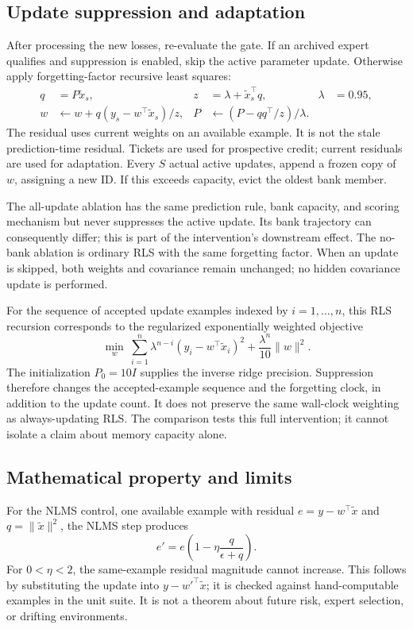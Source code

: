 \documentclass[10pt]{article}
\begin{document}
\subsection{Update suppression and adaptation}
After processing the new losses, re-evaluate the gate. If an archived expert qualifies and suppression is enabled, skip the active parameter update. Otherwise apply forgetting-factor recursive least squares:
\[
 \begin{aligned}
 q&=P\tilde x_s, &z&=\lambda+\tilde x_s^\top q, &\lambda&=0.95,\\
 w&\leftarrow w+q(y_s-w^\top\tilde x_s)/z,
 &P&\leftarrow(P-qq^\top/z)/\lambda.
 \end{aligned}
\]
The residual uses current weights on an available example. It is not the stale prediction-time residual. Tickets are used for prospective credit; current residuals are used for adaptation. Every $S$ actual active updates, append a frozen copy of $w$, assigning a new ID. If this exceeds capacity, evict the oldest bank member.

The all-update ablation has the same prediction rule, bank capacity, and scoring mechanism but never suppresses the active update. Its bank trajectory can consequently differ; this is part of the intervention's downstream effect. The no-bank ablation is ordinary RLS with the same forgetting factor. When an update is skipped, both weights and covariance remain unchanged; no hidden covariance update is performed.

For the sequence of accepted update examples indexed by $i=1,\ldots,n$, this RLS recursion corresponds to the regularized exponentially weighted objective
\[
 \min_w\ \sum_{i=1}^{n}\lambda^{n-i}(y_i-w^\top\tilde x_i)^2
 +\frac{\lambda^n}{10}\|w\|^2.
\]
The initialization $P_0=10I$ supplies the inverse ridge precision. Suppression therefore changes the accepted-example sequence and the forgetting clock, in addition to the update count. It does not preserve the same wall-clock weighting as always-updating RLS. The comparison tests this full intervention; it cannot isolate a claim about memory capacity alone.

\subsection{Mathematical property and limits}
For the NLMS control, one available example with residual $e=y-w^\top\tilde x$ and $q=\|\tilde x\|^2$, the NLMS step produces
\[
 e'=e\left(1-\eta\frac{q}{\epsilon+q}\right).
\]
For $0<\eta<2$, the same-example residual magnitude cannot increase. This follows by substituting the update into $y-w'^\top\tilde x$; it is checked against hand-computable examples in the unit suite. It is not a theorem about future risk, expert selection, or drifting environments.
\end{document}
